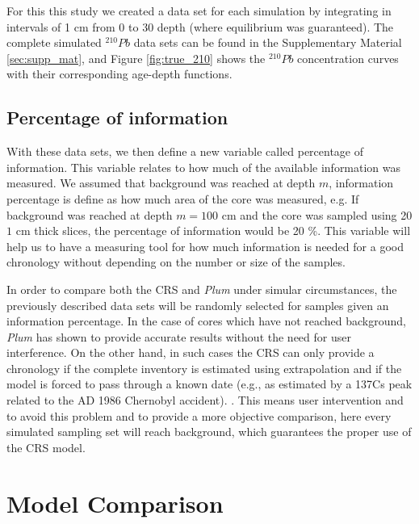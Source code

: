 \documentclass [10pt] {article}
\begin{document}
	For this this study we created a data set for each simulation by integrating in intervals of 1 cm from 0 to 30 depth (where equilibrium was guaranteed).
The complete simulated $^{210}Pb$ data sets can be found in the Supplementary Material \ref{sec:supp_mat}, and Figure \ref{fig:true_210} shows the $^{210}Pb$ concentration curves with their corresponding age-depth functions. 

\subsection{Percentage of information}

	With these data sets, we then define a new variable called percentage of information. 
This variable relates to how much of the available information was measured. 
We assumed that background was reached at depth $m$, information percentage is define as how much area of the core was measured, e.g. 
If background was reached at depth $m=100$ cm and the core was sampled using 20 $1$ cm thick slices, the percentage of information would be 20 \%. 
This variable will help us to have a measuring tool for how much information is needed for a good chronology without depending on the number or size of the samples. 

In order to compare both the CRS and \textit{Plum} under simular circumstances, the previously described data sets will be randomly selected for samples given an information percentage. 
In the case of cores which have not reached background, \textit{Plum} \citep{Aquino2018} has shown to provide accurate results without the need for user interference. 
On the other hand, in such cases the CRS can only provide a chronology if the complete inventory is estimated using extrapolation and if the model is forced to pass through a known date (e.g., as estimated by a 137Cs peak related to the AD 1986 Chernobyl accident). .
This means user intervention and to avoid this problem and to provide a more objective comparison, here every simulated sampling set will reach background, which guarantees the proper use of the CRS model. 



\section{Model Comparison}
\end{document}
